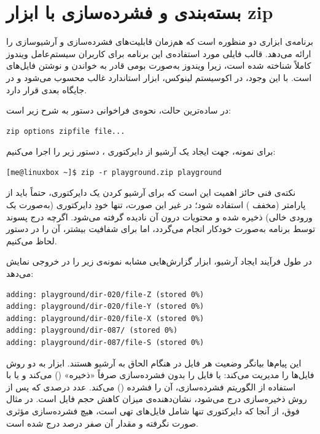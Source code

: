 \section{بسته‌بندی و فشرده‌سازی با ابزار zip}

برنامه‌ی  ابزاری دو منظوره است که هم‌زمان قابلیت‌های فشرده‌سازی و آرشیو‌سازی را ارائه می‌دهد. قالب فایلی مورد استفاده‌ی این برنامه برای کاربران سیستم‌عامل ویندوز کاملاً شناخته شده است، زیرا ویندوز به‌صورت بومی قادر به خواندن و نوشتن فایل‌های  است. با این وجود، در اکوسیستم لینوکس، ابزار  استاندارد غالب محسوب می‌شود و  در جایگاه بعدی قرار دارد.

در ساده‌ترین حالت، نحوه‌ی فراخوانی دستور  به شرح زیر است:

\begin{latin}
\begin{lstlisting}
zip options zipfile file...
\end{lstlisting}
\end{latin}

برای نمونه، جهت ایجاد یک آرشیو  از دایرکتوری ، دستور زیر را اجرا می‌کنیم:

\begin{latin}
\begin{lstlisting}
[me@linuxbox ~]$ zip -r playground.zip playground
\end{lstlisting}
\end{latin}

نکته‌ی فنی حائز اهمیت این است که برای آرشیو کردن یک دایرکتوری، حتماً باید از پارامتر  (مخفف ) استفاده شود؛ در غیر این صورت، تنها خودِ دایرکتوری  (به‌صورت یک ورودی خالی) ذخیره شده و محتویات درون آن نادیده گرفته می‌شود. اگرچه درج پسوند  توسط برنامه به‌صورت خودکار انجام می‌گردد، اما برای شفافیت بیشتر، آن را در دستور لحاظ می‌کنیم.

در طول فرآیند ایجاد آرشیو، ابزار  گزارش‌هایی مشابه نمونه‌ی زیر را در خروجی نمایش می‌دهد:

\begin{latin}
\begin{lstlisting}
adding: playground/dir-020/file-Z (stored 0%)
adding: playground/dir-020/file-Y (stored 0%)
adding: playground/dir-020/file-X (stored 0%)
adding: playground/dir-087/ (stored 0%)
adding: playground/dir-087/file-S (stored 0%)
\end{lstlisting}
\end{latin}

این پیام‌ها بیانگر وضعیت هر فایل در هنگام الحاق به آرشیو هستند. ابزار  به دو روش فایل‌ها را مدیریت می‌کند: یا فایل را بدون فشرده‌سازی صرفاً «ذخیره» () می‌کند و یا با استفاده از الگوریتم فشرده‌سازی، آن را فشرده () می‌کند. عدد درصدی که پس از روش ذخیره‌سازی درج می‌شود، نشان‌دهنده‌ی میزان کاهش حجم فایل است. در مثال فوق، از آنجا که دایرکتوری  تنها شامل فایل‌های تهی است، هیچ فشرده‌سازی مؤثری صورت نگرفته و مقدار آن صفر درصد درج شده است.

